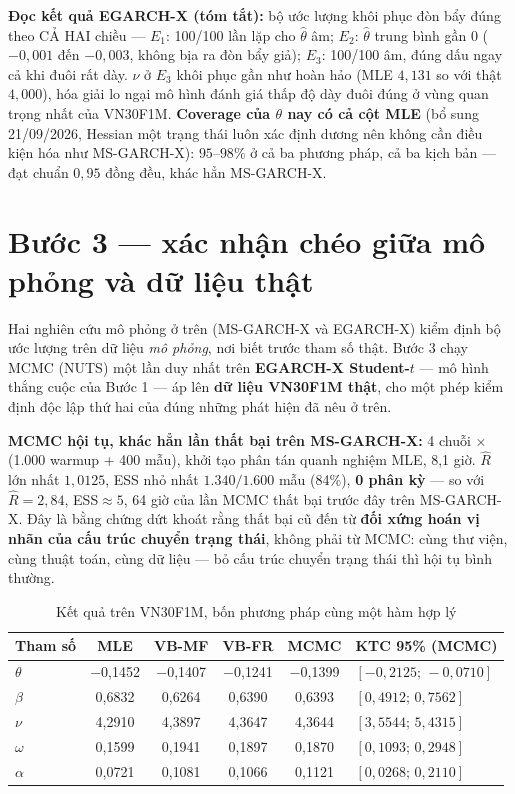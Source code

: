 \documentclass[11pt,a4paper]{article}
\begin{document}
\bigskip

\textbf{Đọc kết quả EGARCH-X (tóm tắt):} bộ ước lượng khôi phục đòn bẩy đúng theo CẢ
HAI chiều --- $E_1$: 100/100 lần lặp cho $\hat\theta$ âm; $E_2$: $\hat\theta$
trung bình gần 0 ($-0{,}001$ đến $-0{,}003$, không bịa ra đòn bẩy giả); $E_3$:
100/100 âm, đúng dấu ngay cả khi đuôi rất dày. $\nu$ ở $E_3$ khôi phục gần như
hoàn hảo (MLE $4{,}131$ so với thật $4{,}000$), hóa giải lo ngại mô hình đánh
giá thấp độ dày đuôi đúng ở vùng quan trọng nhất của VN30F1M. \textbf{Coverage
của $\theta$ nay có cả cột MLE} (bổ sung 21/09/2026, Hessian một trạng thái
luôn xác định dương nên không cần điều kiện hóa như MS-GARCH-X): $95$--$98\%$ ở cả
ba phương pháp, cả ba kịch bản --- đạt chuẩn $0{,}95$ đồng đều, khác hẳn MS-GARCH-X.

\clearpage
\section{Bước 3 --- xác nhận chéo giữa mô phỏng và dữ liệu thật}

Hai nghiên cứu mô phỏng ở trên (MS-GARCH-X và EGARCH-X) kiểm định bộ ước
lượng trên dữ liệu \emph{mô phỏng}, nơi biết trước tham số thật. Bước 3 chạy
MCMC (NUTS) một lần duy nhất trên \textbf{EGARCH-X Student-$t$} --- mô hình
thắng cuộc của Bước 1 --- áp lên \textbf{dữ liệu VN30F1M thật}, cho một phép
kiểm định độc lập thứ hai của đúng những phát hiện đã nêu ở trên.

\textbf{MCMC hội tụ, khác hẳn lần thất bại trên MS-GARCH-X:} 4 chuỗi $\times$
(1.000 warmup + 400 mẫu), khởi tạo phân tán quanh nghiệm MLE, 8,1 giờ.
$\hat R$ lớn nhất $1{,}0125$, ESS nhỏ nhất $1.340/1.600$ mẫu (84\%), \textbf{0
phân kỳ} --- so với $\hat R=2{,}84$, ESS$\approx 5$, 64 giờ của lần MCMC thất
bại trước đây trên MS-GARCH-X. Đây là bằng chứng dứt khoát rằng thất bại cũ
đến từ \textbf{đối xứng hoán vị nhãn của cấu trúc chuyển trạng thái}, không
phải từ MCMC: cùng thư viện, cùng thuật toán, cùng dữ liệu --- bỏ cấu trúc
chuyển trạng thái thì hội tụ bình thường.

\begin{table}[H]\centering\small
\caption{Kết quả trên VN30F1M, bốn phương pháp cùng một hàm hợp lý}
\begin{tabularx}{\textwidth}{l C C C C L}
\toprule
\textbf{Tham số} & \textbf{MLE} & \textbf{VB-MF} & \textbf{VB-FR} & \textbf{MCMC} & \textbf{KTC 95\% (MCMC)} \\
\midrule
$\theta$ & $-$0{,}1452 & $-$0{,}1407 & $-$0{,}1241 & $-$0{,}1399 & $[-0{,}2125;\,-0{,}0710]$ \\
$\beta$ & 0{,}6832 & 0{,}6264 & 0{,}6390 & 0{,}6393 & $[0{,}4912;\,0{,}7562]$ \\
$\nu$ & 4{,}2910 & 4{,}3897 & 4{,}3647 & 4{,}3644 & $[3{,}5544;\,5{,}4315]$ \\
$\omega$ & 0{,}1599 & 0{,}1941 & 0{,}1897 & 0{,}1870 & $[0{,}1093;\,0{,}2948]$ \\
$\alpha$ & 0{,}0721 & 0{,}1081 & 0{,}1066 & 0{,}1121 & $[0{,}0268;\,0{,}2110]$ \\
\bottomrule
\end{tabularx}
\end{table}
\end{document}
